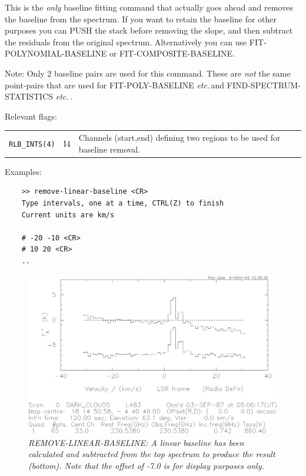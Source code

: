 \documentclass[11pt,twoside]{report}
\newcommand{\etc}{{\it etc.\,}}
\begin{document}
This is the {\em only} baseline fitting command that actually goes ahead
and removes the baseline from the spectrum. If you want to retain the
baseline for other purposes you can PUSH the stack before removing the
slope, and then subtract the residuals from the original spectrum.
Alternatively you can use FIT-POLYNOMIAL-BASELINE or FIT-COMPOSITE-BASELINE.
 

Note: Only 2 baseline pairs are used for this command. These are {\em not} the
same point-pairs that are used for FIT-POLY-BASELINE \etc and
FIND-SPECTRUM-STATISTICS \etc.

Relevant flags:\\
\begin{tabular}{lll}
  \verb+RLB_INTS(4)+ & I4 & \parbox[t]{4in}
                            {Channels (start,end) defining two regions
                             to be used for baseline removal.}
\end{tabular}

Examples:
\begin{verbatim}
    >> remove-linear-baseline <CR>
    Type intervals, one at a time, CTRL(Z) to finish
    Current units are km/s

    # -20 -10 <CR>
    # 10 20 <CR>
    ..
\end{verbatim}

\begin{figure}[htbp]
\begin{center}
\includegraphics[scale=0.65]{r-l-b.ps}
\protect\parbox{5.5in}
{\caption[RLB]
{\sl
REMOVE-LINEAR-BASELINE: A linear baseline has been calculated and subtracted
from the top spectrum to produce the result (bottom). Note that the offset
of -7.0 is for display purposes only.
\label{RLB}
}
}
\end{center}
\end{figure}
\end{document}
